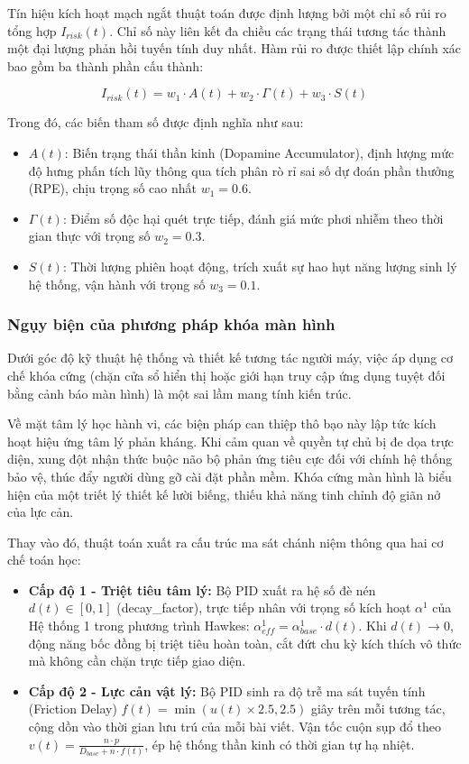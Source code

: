 Tín hiệu kích hoạt mạch ngắt thuật toán được định lượng bởi một chỉ số rủi ro tổng hợp $I_{risk}(t)$. Chỉ số này liên kết đa chiều các trạng thái tương tác thành một đại lượng phản hồi tuyến tính duy nhất. Hàm rủi ro được thiết lập chính xác bao gồm ba thành phần cấu thành:

\begin{equation}
    I_{risk}(t) = w_1 \cdot A(t) + w_2 \cdot \Gamma(t) + w_3 \cdot S(t)
    \label{eq:risk_index}
\end{equation}

Trong đó, các biến tham số được định nghĩa như sau:
\begin{itemize}
    \item $A(t)$: Biến trạng thái thần kinh (Dopamine Accumulator), định lượng mức độ hưng phấn tích lũy thông qua tích phân rò rỉ sai số dự đoán phần thưởng (RPE), chịu trọng số cao nhất $w_1 = 0.6$.
    \item $\Gamma(t)$: Điểm số độc hại quét trực tiếp, đánh giá mức phơi nhiễm theo thời gian thực với trọng số $w_2 = 0.3$.
    \item $S(t)$: Thời lượng phiên hoạt động, trích xuất sự hao hụt năng lượng sinh lý hệ thống, vận hành với trọng số $w_3 = 0.1$.
\end{itemize}

\subsubsection{Ngụy biện của phương pháp khóa màn hình}

Dưới góc độ kỹ thuật hệ thống và thiết kế tương tác người máy, việc áp dụng cơ chế khóa cứng (chặn cửa sổ hiển thị hoặc giới hạn truy cập ứng dụng tuyệt đối bằng cảnh báo màn hình) là một sai lầm mang tính kiến trúc. 

Về mặt tâm lý học hành vi, các biện pháp can thiệp thô bạo này lập tức kích hoạt hiệu ứng tâm lý phản kháng. Khi cảm quan về quyền tự chủ bị đe dọa trực diện, xung đột nhận thức buộc não bộ phản ứng tiêu cực đối với chính hệ thống bảo vệ, thúc đẩy người dùng gỡ cài đặt phần mềm. Khóa cứng màn hình là biểu hiện của một triết lý thiết kế lười biếng, thiếu khả năng tinh chỉnh độ giãn nở của lực cản.

Thay vào đó, thuật toán xuất ra cấu trúc ma sát chánh niệm thông qua hai cơ chế toán học:

\begin{itemize}
    \item \textbf{Cấp độ 1 - Triệt tiêu tâm lý:} Bộ PID xuất ra hệ số đè nén $d(t) \in [0, 1]$ (decay\_factor), trực tiếp nhân với trọng số kích hoạt $\alpha^1$ của Hệ thống 1 trong phương trình Hawkes: $\alpha^1_{eff} = \alpha^1_{base} \cdot d(t)$. Khi $d(t) \to 0$, động năng bốc đồng bị triệt tiêu hoàn toàn, cắt đứt chu kỳ kích thích vô thức mà không cần chặn trực tiếp giao diện.
    \item \textbf{Cấp độ 2 - Lực cản vật lý:} Bộ PID sinh ra độ trễ ma sát tuyến tính (Friction Delay) $f(t) = \min(u(t) \times 2.5, 2.5)$ giây trên mỗi tương tác, cộng dồn vào thời gian lưu trú của mỗi bài viết. Vận tốc cuộn sụp đổ theo $v(t) = \frac{n \cdot p}{D_{base} + n \cdot f(t)}$, ép hệ thống thần kinh có thời gian tự hạ nhiệt.
\end{itemize}

